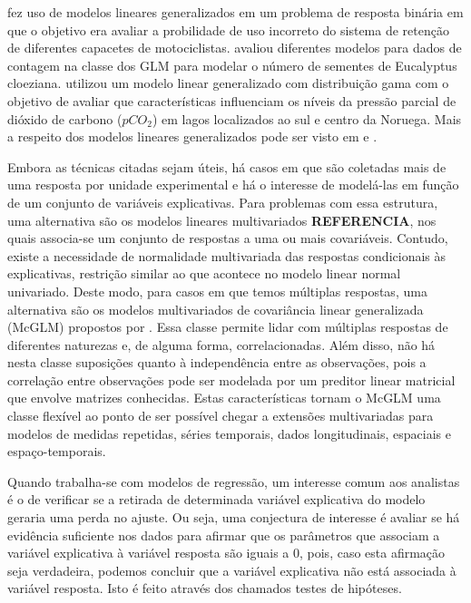 \citet{capacete} fez uso de modelos lineares generalizados em um problema de resposta binária em que o objetivo era avaliar a probilidade de uso incorreto do sistema de retenção de diferentes capacetes de motociclistas. \citet{euc} avaliou diferentes modelos para dados de contagem na classe dos GLM para modelar o número de sementes de Eucalyptus cloeziana. \cite{pco2} utilizou um modelo linear generalizado com distribuição gama com o objetivo de avaliar que características influenciam os níveis da pressão
parcial de dióxido de carbono ($pCO_2$) em lagos localizados ao sul e centro da Noruega. Mais a respeito dos modelos lineares generalizados pode ser visto em \citet{paula} e \citet{cordeiro}.

Embora as técnicas citadas sejam úteis, há casos em que são coletadas mais de uma resposta por unidade experimental e há o interesse de modelá-las em função de um conjunto de variáveis explicativas. Para problemas com essa estrutura, uma alternativa são os modelos lineares multivariados \textbf{REFERENCIA}, nos quais associa-se um conjunto de respostas a uma ou mais covariáveis. Contudo, existe a necessidade de normalidade multivariada das respostas condicionais às explicativas, restrição similar ao que acontece no modelo linear normal univariado. Deste modo, para casos em que temos múltiplas respostas, uma alternativa são os modelos multivariados de covariância linear generalizada (McGLM) propostos por \citet{Bonat16}. Essa classe permite lidar com múltiplas respostas de diferentes naturezas e, de alguma forma, correlacionadas. Além disso, não há nesta classe suposições quanto à independência entre as observações, pois a correlação entre observações pode ser modelada por um preditor linear matricial que envolve matrizes conhecidas. Estas características tornam o McGLM uma classe flexível ao ponto de ser possível chegar a extensões multivariadas para modelos de medidas repetidas, séries temporais, dados longitudinais, espaciais e espaço-temporais.


Quando trabalha-se com modelos de regressão, um interesse comum aos analistas é o de verificar se a retirada de determinada variável explicativa do modelo geraria uma perda no ajuste. Ou seja, uma conjectura de interesse é avaliar se há evidência suficiente nos dados para afirmar que os parâmetros que associam a variável explicativa à variável resposta são iguais a 0, pois, caso esta afirmação seja verdadeira, podemos concluir que a variável explicativa não está associada à variável resposta. Isto é feito através dos chamados testes de hipóteses. 

